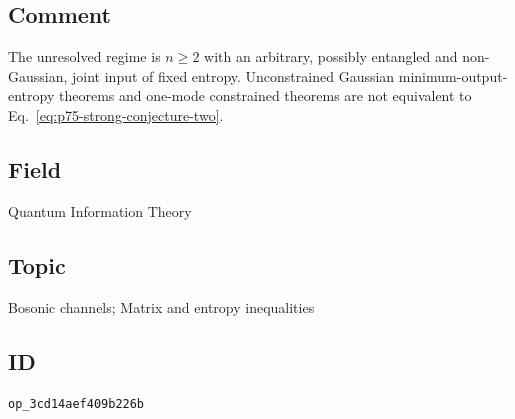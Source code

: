\subsection*{Comment}

The unresolved regime is $n\geq2$ with an arbitrary, possibly entangled and
non-Gaussian, joint input of fixed entropy.  Unconstrained Gaussian
minimum-output-entropy theorems and one-mode constrained theorems are not
equivalent to Eq.~\eqref{eq:p75-strong-conjecture-two}.

\subsection*{Field}

Quantum Information Theory

\subsection*{Topic}

Bosonic channels; Matrix and entropy inequalities

\subsection*{ID}

\texttt{op\_3cd14aef409b226b}
